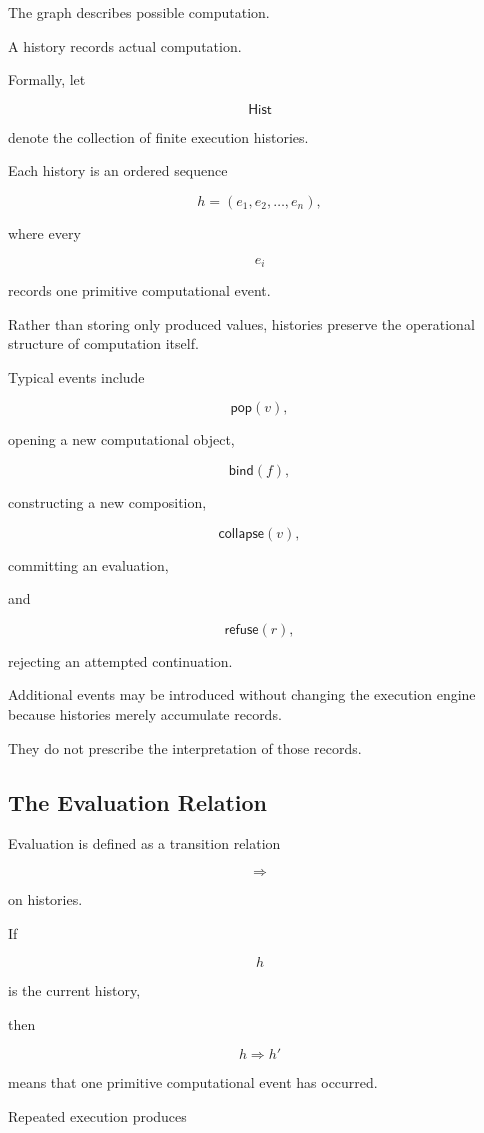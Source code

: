 \documentclass[12pt,oneside]{article}
\newcommand{\Pop}{\mathsf{pop}}
\newcommand{\Refuse}{\mathsf{refuse}}
\newcommand{\Collapse}{\mathsf{collapse}}
\newcommand{\Bind}{\mathsf{bind}}
\newcommand{\Hist}{\mathsf{Hist}}
\begin{document}
The graph describes possible computation.

A history records actual computation.

Formally, let

\[
\Hist
\]

denote the collection of finite execution histories.

Each history is an ordered sequence

\[
h=(e_1,e_2,\ldots,e_n),
\]

where every

\[
e_i
\]

records one primitive computational event.

Rather than storing only produced values, histories preserve the operational structure of computation itself.

Typical events include

\[
\Pop(v),
\]

opening a new computational object,

\[
\Bind(f),
\]

constructing a new composition,

\[
\Collapse(v),
\]

committing an evaluation,

and

\[
\Refuse(r),
\]

rejecting an attempted continuation.

Additional events may be introduced without changing the execution engine because histories merely accumulate records.

They do not prescribe the interpretation of those records.

\subsection{The Evaluation Relation}

Evaluation is defined as a transition relation

\[
\Longrightarrow
\]

on histories.

If

\[
h
\]

is the current history,

then

\[
h
\Longrightarrow
h'
\]

means that one primitive computational event has occurred.

Repeated execution produces
\end{document}
